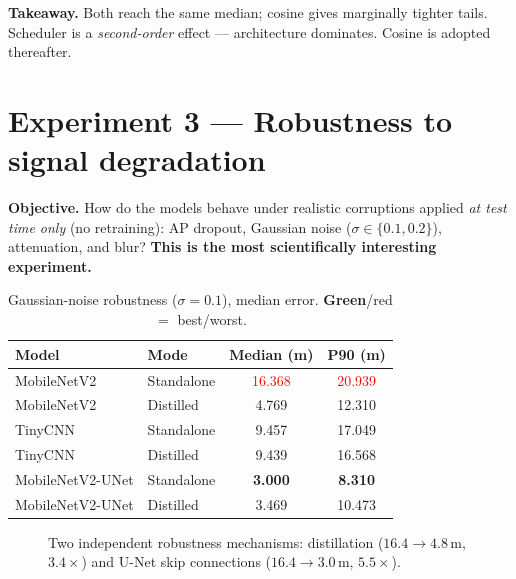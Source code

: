 \documentclass[11pt,a4paper]{article}
\newcommand{\best}[1]{\textcolor{ours}{\textbf{#1}}}
\begin{document}
\textbf{Takeaway.} Both reach the same median; cosine gives marginally tighter tails. Scheduler is
a \emph{second-order} effect --- architecture dominates. Cosine is adopted thereafter.

\section{Experiment 3 --- Robustness to signal degradation}

\textbf{Objective.} How do the models behave under realistic corruptions applied \emph{at test
time only} (no retraining): AP dropout, Gaussian noise ($\sigma\in\{0.1,0.2\}$), attenuation, and
blur? \textbf{This is the most scientifically interesting experiment.}

\begin{table}[H]
\centering
\caption{Gaussian-noise robustness ($\sigma=0.1$), median error. \best{Green}/red $=$ best/worst.}
\begin{tabular}{@{}llcc@{}}
\toprule
Model & Mode & Median (m) & P90 (m) \\
\midrule
MobileNetV2      & Standalone & \textcolor{red}{16.368} & \textcolor{red}{20.939} \\
MobileNetV2      & Distilled  & 4.769 & 12.310 \\
TinyCNN          & Standalone & 9.457 & 17.049 \\
TinyCNN          & Distilled  & 9.439 & 16.568 \\
MobileNetV2-UNet & Standalone & \best{3.000} & \best{8.310} \\
MobileNetV2-UNet & Distilled  & 3.469 & 10.473 \\
\bottomrule
\end{tabular}
\end{table}

\begin{figure}[H]
\centering
{}
\caption{Two independent robustness mechanisms: distillation ($16.4\!\to\!4.8$\,m, $3.4\times$)
and U-Net skip connections ($16.4\!\to\!3.0$\,m, $5.5\times$).}
\end{figure}
\end{document}

